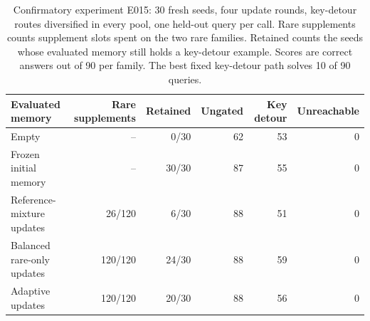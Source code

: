 \begin{table}[t]
\centering
\caption{Confirmatory experiment E015: 30 fresh seeds, four update
rounds, key-detour routes diversified in every pool, one held-out query
per call. Rare supplements counts supplement slots spent on the two rare
families. Retained counts the seeds whose evaluated memory still holds a
key-detour example. Scores are correct answers out of 90 per family. The
best fixed key-detour path solves 10 of 90 queries.}
\label{tab:confirmatory}
\setlength{\tabcolsep}{4.5pt}
\begin{tabular}{lrrrrr}
\toprule
Evaluated memory & Rare supplements & Retained & Ungated & Key detour & Unreachable \\
\midrule
Empty & -- & 0/30 & 62 & 53 & 0 \\
Frozen initial memory & -- & 30/30 & 87 & 55 & 0 \\
Reference-mixture updates & 26/120 & 6/30 & 88 & 51 & 0 \\
Balanced rare-only updates & 120/120 & 24/30 & 88 & 59 & 0 \\
Adaptive updates & 120/120 & 20/30 & 88 & 56 & 0 \\
\bottomrule
\end{tabular}
\end{table}
